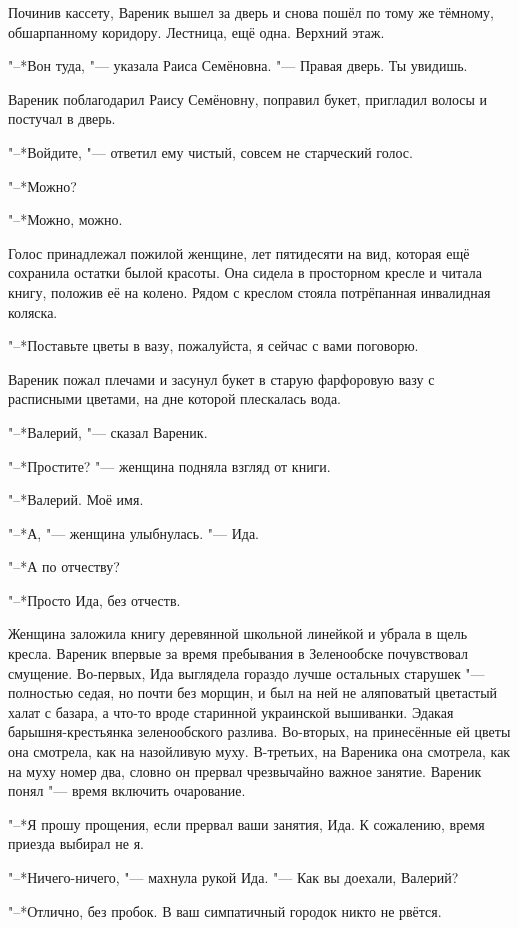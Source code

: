 Починив кассету, Вареник вышел за дверь и снова пошёл по тому же тёмному, обшарпанному коридору.
Лестница, ещё одна.
Верхний этаж.

"--*Вон туда, "--- указала Раиса Семёновна.
"--- Правая дверь.
Ты увидишь.

Вареник поблагодарил Раису Семёновну, поправил букет, пригладил волосы и постучал в дверь.

"--*Войдите, "--- ответил ему чистый, совсем не старческий голос.

\asterism

"--*Можно?

"--*Можно, можно.

Голос принадлежал пожилой женщине, лет пятидесяти на вид, которая ещё сохранила остатки былой красоты.
Она сидела в просторном кресле и читала книгу, положив её на колено.
Рядом с креслом стояла потрёпанная инвалидная коляска.

"--*Поставьте цветы в вазу, пожалуйста, я сейчас с вами поговорю.

Вареник пожал плечами и засунул букет в старую фарфоровую вазу с расписными цветами, на дне которой плескалась вода.

"--*Валерий, "--- сказал Вареник.

"--*Простите? "--- женщина подняла взгляд от книги.

"--*Валерий.
Моё имя.

"--*А, "--- женщина улыбнулась.
"--- Ида.

"--*А по отчеству?

"--*Просто Ида, без отчеств.

Женщина заложила книгу деревянной школьной линейкой и убрала в щель кресла.
Вареник впервые за время пребывания в Зеленообске почувствовал смущение.
Во-первых, Ида выглядела гораздо лучше остальных старушек "--- полностью седая, но почти без морщин, и был на ней не аляповатый цветастый халат с базара, а что-то вроде старинной украинской вышиванки.
Эдакая барышня-крестьянка зеленообского разлива.
Во-вторых, на принесённые ей цветы она смотрела, как на назойливую муху.
В-третьих, на Вареника она смотрела, как на муху номер два, словно он прервал чрезвычайно важное занятие.
Вареник понял "--- время включить очарование.

"--*Я прошу прощения, если прервал ваши занятия, Ида.
К сожалению, время приезда выбирал не я.

"--*Ничего-ничего, "--- махнула рукой Ида.
"--- Как вы доехали, Валерий?

"--*Отлично, без пробок.
В ваш симпатичный городок никто не рвётся.

